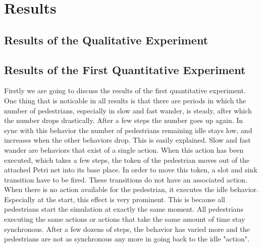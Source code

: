 \documentclass[11pt]{book}
\begin{document}

\chapter{Results}
\label{chap:results}

\section{Results of the Qualitative Experiment}
\label{sec:qualitativeresults}




\section{Results of the First Quantitative Experiment}
\label{sec:firstquantitative}
Firstly we are going to discuss the results of the first quantitative experiment. One thing that is noticable in all results is that there are periods in which the number of pedestrians, especially in slow and fast wander, is steady, after which the number drops drastically. After a few steps the number goes up again. In sync with this behavior the number of pedestrians remaining idle stays low, and increases when the other behaviors drop. This is easily explained. Slow and fast wander are behaviors that exist of a single action. When this action has been executed, which takes a few steps, the token of the pedestrian moves out of the attached Petri net into its base place. In order to move this token, a slot and sink transition have to be fired. These transitions do not have an associated action. When there is no action available for the pedestrian, it executes the idle behavior. Especially at the start, this effect is very prominent. This is because all pedestrians start the simulation at exactly the same moment. All pedestrians executing the same actions or actions that take the same amount of time stay synchronous. After a few dozens of steps, the behavior has varied more and the pedestrians are not as synchronous any more in going back to the idle "action".
\end{document}
